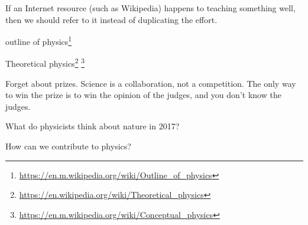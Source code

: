 If an Internet resource (such as Wikipedia)
happens to teaching something well,
then we should refer to it instead of duplicating the effort.

outline of physics\footnote{\url{https://en.m.wikipedia.org/wiki/Outline_of_physics}}

Theoretical physics\footnote{\url{https://en.wikipedia.org/wiki/Theoretical_physics}}
\footnote{\url{https://en.m.wikipedia.org/wiki/Conceptual_physics}}



Forget about prizes.
Science is a collaboration, not a competition.
The only way to win the prize is to win the opinion of the judges,
and you don't know the judges.

What do physicists think about nature in 2017?

How can we contribute to physics?
